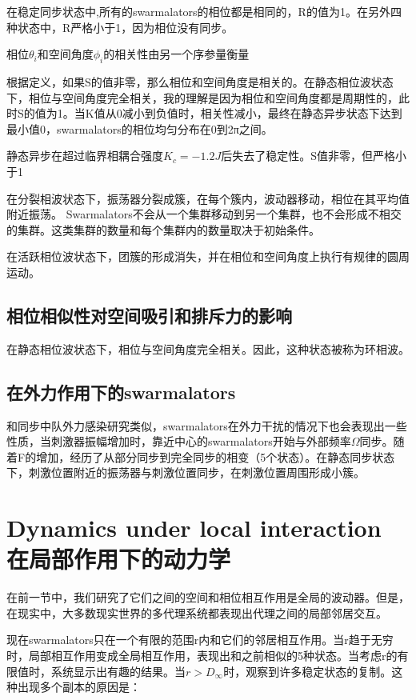 \documentclass[12pt, oneside]{ctexbook}
\begin{document}
在稳定同步状态中,所有的swarmalators的相位都是相同的，R的值为1。在另外四种状态中，R严格小于1，因为相位没有同步。

相位$\theta_i$和空间角度$\phi_i$的相关性由另一个序参量衡量

根据定义，如果S的值非零，那么相位和空间角度是相关的。在静态相位波状态下，相位与空间角度完全相关，我的理解是因为相位和空间角度都是周期性的，此时S的值为1。当K值从0减小到负值时，相关性减小，最终在静态异步状态下达到最小值0，swarmalators的相位均匀分布在0到2π之间。

静态异步在超过临界相耦合强度$K_c=-1.2J$后失去了稳定性。S值非零，但严格小于1

在分裂相波状态下，振荡器分裂成簇，在每个簇内，波动器移动，相位在其平均值附近振荡。 Swarmalators不会从一个集群移动到另一个集群，也不会形成不相交的集群。这类集群的数量和每个集群内的数量取决于初始条件。

在活跃相位波状态下，团簇的形成消失，并在相位和空间角度上执行有规律的圆周运动。

\subsection{相位相似性对空间吸引和排斥力的影响}

在静态相位波状态下，相位与空间角度完全相关。因此，这种状态被称为环相波。

\subsection{在外力作用下的swarmalators}

和同步中队外力感染研究类似，swarmalators在外力干扰的情况下也会表现出一些性质，当刺激器振幅增加时，靠近中心的swarmalators开始与外部频率$\Omega$同步。随着F的增加，经历了从部分同步到完全同步的相变（5个状态）。在静态同步状态下，刺激位置附近的振荡器与刺激位置同步，在刺激位置周围形成小簇。

\section{Dynamics under local interaction \newline 在局部作用下的动力学}

在前一节中，我们研究了它们之间的空间和相位相互作用是全局的波动器。但是，在现实中，大多数现实世界的多代理系统都表现出代理之间的局部邻居交互。

现在swarmalators只在一个有限的范围r内和它们的邻居相互作用。当r趋于无穷时，局部相互作用变成全局相互作用，表现出和之前相似的5种状态。当考虑r的有限值时，系统显示出有趣的结果。当$r>D_\infty$时，观察到许多稳定状态的复制。这种出现多个副本的原因是：
\end{document}
